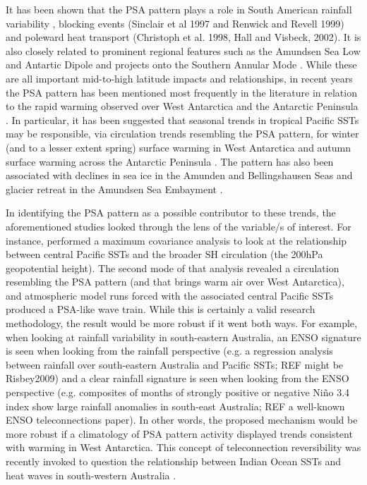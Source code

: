 It has been shown that the PSA pattern plays a role in South American rainfall variability \citep{Mo2001}, blocking events (Sinclair et al 1997 and Renwick and Revell 1999) and poleward heat transport (Christoph et al. 1998, Hall and Visbeck, 2002). It is also closely related to prominent regional features such as the Amundsen Sea Low \citep{Turner2013} and Antartic Dipole \citep{Yuan2001} and projects onto the Southern Annular Mode \citep{Ding2012}. While these are all important mid-to-high latitude impacts and relationships, in recent years the PSA pattern has been mentioned most frequently in the literature in relation to the rapid warming observed over West Antarctica and the Antarctic Peninsula \citep{Nicolas2014}. In particular, it has been suggested that seasonal trends in tropical Pacific SSTs may be responsible, via circulation trends resembling the PSA pattern, for winter (and to a lesser extent spring) surface warming in West Antarctica \citep{Ding2011} and autumn surface warming across the Antarctic Peninsula \citep{Ding2013}. The pattern has also been associated with declines in sea ice in the Amunden and Bellingshausen Seas \citep{Schneider2012} and glacier retreat in the Amundsen Sea Embayment \citep{Steig2012}.

In identifying the PSA pattern as a possible contributor to these trends, the aforementioned studies looked through the lens of the variable/s of interest. For instance, \citet{Ding2011} performed a maximum covariance analysis to look at the relationship between central Pacific SSTs and the broader SH circulation (the 200hPa geopotential height). The second mode of that analysis revealed a circulation resembling the PSA pattern (and that brings warm air over West Antarctica), and atmospheric model runs forced with the associated central Pacific SSTs produced a PSA-like wave train. While this is certainly a valid research methodology, the result would be more robust if it went both ways. For example, when looking at rainfall variability in south-eastern Australia, an ENSO signature is seen when looking from the rainfall perspective (e.g. a regression analysis between rainfall over south-eastern Australia and Pacific SSTs; REF might be Risbey2009) and a clear rainfall signature is seen when looking from the ENSO perspective (e.g. composites of months of strongly positive or negative Ni\~{n}o 3.4 index show large rainfall anomalies in south-east Australia; REF a well-known ENSO teleconnections paper). In other words, the proposed mechanism would be more robust if a climatology of PSA pattern activity displayed trends consistent with warming in West Antarctica. This concept of teleconnection reversibility was recently invoked to question the relationship between Indian Ocean SSTs and heat waves in south-western Australia \citep{Boschat2016}.  

